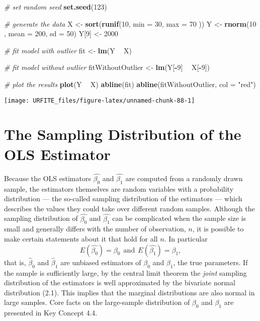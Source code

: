 \documentclass[]{book}
\newenvironment{Shaded}{\begin{snugshade}}{\end{snugshade}}
\newcommand{\KeywordTok}[1]{\textcolor[rgb]{0.13,0.29,0.53}{\textbf{#1}}}
\newcommand{\DataTypeTok}[1]{\textcolor[rgb]{0.13,0.29,0.53}{#1}}
\newcommand{\DecValTok}[1]{\textcolor[rgb]{0.00,0.00,0.81}{#1}}
\newcommand{\StringTok}[1]{\textcolor[rgb]{0.31,0.60,0.02}{#1}}
\newcommand{\CommentTok}[1]{\textcolor[rgb]{0.56,0.35,0.01}{\textit{#1}}}
\newcommand{\OperatorTok}[1]{\textcolor[rgb]{0.81,0.36,0.00}{\textbf{#1}}}
\newcommand{\NormalTok}[1]{#1}
\theoremstyle{definition}
\theoremstyle{definition}
\theoremstyle{definition}
\theoremstyle{remark}
\begin{document}
\begin{Shaded}
\begin{Highlighting}[]
\CommentTok{# set random seed}
\KeywordTok{set.seed}\NormalTok{(}\DecValTok{123}\NormalTok{)}

\CommentTok{# generate the data}
\NormalTok{X <-}\StringTok{ }\KeywordTok{sort}\NormalTok{(}\KeywordTok{runif}\NormalTok{(}\DecValTok{10}\NormalTok{, }\DataTypeTok{min =} \DecValTok{30}\NormalTok{, }\DataTypeTok{max =} \DecValTok{70}\NormalTok{ ))}
\NormalTok{Y <-}\StringTok{ }\KeywordTok{rnorm}\NormalTok{(}\DecValTok{10}\NormalTok{ , }\DataTypeTok{mean =} \DecValTok{200}\NormalTok{, }\DataTypeTok{sd =} \DecValTok{50}\NormalTok{)}
\NormalTok{Y[}\DecValTok{9}\NormalTok{] <-}\StringTok{ }\DecValTok{2000}

\CommentTok{# fit model with outlier}
\NormalTok{fit <-}\StringTok{ }\KeywordTok{lm}\NormalTok{(Y }\OperatorTok{~}\StringTok{ }\NormalTok{X)}

\CommentTok{# fit model without outlier}
\NormalTok{fitWithoutOutlier <-}\StringTok{ }\KeywordTok{lm}\NormalTok{(Y[}\OperatorTok{-}\DecValTok{9}\NormalTok{] }\OperatorTok{~}\StringTok{ }\NormalTok{X[}\OperatorTok{-}\DecValTok{9}\NormalTok{])}

\CommentTok{# plot the results}
\KeywordTok{plot}\NormalTok{(Y }\OperatorTok{~}\StringTok{ }\NormalTok{X)}
\KeywordTok{abline}\NormalTok{(fit)}
\KeywordTok{abline}\NormalTok{(fitWithoutOutlier, }\DataTypeTok{col =} \StringTok{"red"}\NormalTok{)}
\end{Highlighting}
\end{Shaded}

\begin{center}\texttt{[image: URFITE\_files/figure-latex/unnamed-chunk-88-1]} \end{center}

\hypertarget{tsdotoe}{\section{The Sampling Distribution of the OLS
Estimator}\label{tsdotoe}}

Because the OLS estimators \(\hat{\beta_0}\) and \(\hat{\beta_1}\) are
computed from a randomly drawn sample, the estimators themselves are
random variables with a probability distribution --- the so-called
sampling distribution of the estimators --- which describes the values
they could take over different random samples. Although the sampling
distribution of \(\hat{\beta_0}\) and \(\hat{\beta_1}\) can be
complicated when the sample size is small and generally differs with the
number of observation, \(n\), it is possible to make certain statements
about it that hold for all \(n\). In particular
\[ E(\hat{\beta_0}) = \beta_0 \ \ \text{and} \ \  E(\hat{\beta_1}) = \beta_1,\]
that is, \(\hat\beta_0\) and \(\hat\beta_1\) are unbiased estimators of
\(\beta_0\) and \(\beta_1\), the true parameters. If the sample is
sufficiently large, by the central limit theorem the \emph{joint}
sampling distribution of the estimators is well approximated by the
bivariate normal distribution (2.1). This implies that the marginal
distributions are also normal in large samples. Core facts on the
large-sample distribution of \(\beta_0\) and \(\beta_1\) are presented
in Key Concept 4.4.
\end{document}
